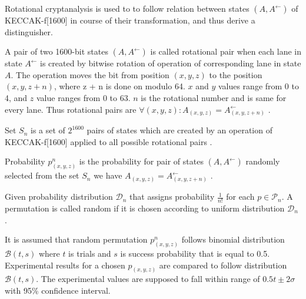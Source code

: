 
Rotational cryptanalysis\cite{00041} is used to to follow relation between states $(A, A^{\leftarrow})$ of 
KECCAK-f[1600] in course of their transformation, and thus derive a distinguisher.

\begin{defn}
A pair of two 1600-bit states $(A, A^{\leftarrow})$ is called rotational pair when each lane in state $A^{\leftarrow}$
is created by bitwise rotation of operation of corresponding lane in state $A$. The operation moves the bit from 
position $(x, y, z)$ to the position $(x, y, z + n)$, where z + n is done on modulo 64. $x$ and $y$ values range from 0 
to 4, and $z$ value ranges from 0 to 63. $n$ is the rotational number and is same for every lane. Thus rotational pairs
are $\forall(x, y, z) : A_{(x, y, z)} = A^{\leftarrow}_{(x, y, z + n)}$ \cite{00022}.
\end{defn}

\begin{defn}
Set $S_n$ is a set of $2^{1600}$ pairs of states which are created by an operation of KECCAK-f[1600] applied to all
possible rotational pairs \cite{00022}.
\end{defn}

\begin{defn}
Probability $p^{n}_{(x, y, z)}$ is the probability for pair of states $(A, A^{\leftarrow})$ randomly selected from the
set $S_n$ we have $A_{(x, y, z)} = A^{\leftarrow}_{(x, y, z + n)}$ \cite{00022}.
\end{defn}

\begin{defn}
Given probability distribution $\mathcal{D}_n$ that assigns probability $\frac{1}{n!}$ for each $p \in \mathcal{P}_n$.
A permutation is called random if it is chosen according to uniform distribution $\mathcal{D}_n$ \cite{00022}.
\end{defn}

It is assumed that random permutation $p^n_{(x, y, z)}$ follows binomial distribution $\mathcal{B}(t, s)$ where $t$ is
trials and $s$ is success probability that is equal to 0.5. Experimental results for a chosen $p_{(x, y, z)}$ are 
compared to follow distribution $\mathcal{B}(t, s)$. The experimental values are supposed to fall within range of 
$0.5t\pm2\sigma$ with 95\% confidence interval.

